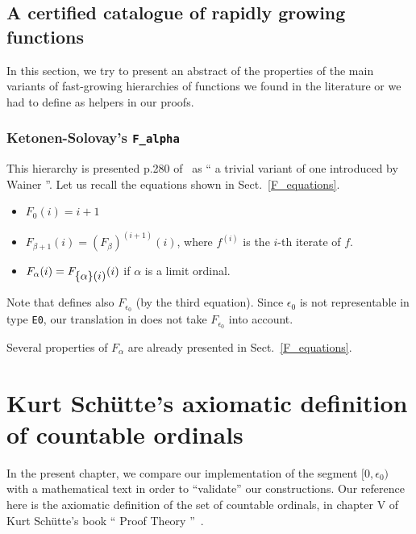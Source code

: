 \section{A certified catalogue of rapidly growing functions}

In this section, we try to present an abstract of the properties of the main variants of fast-growing hierarchies of functions
we found in the literature or we had to define as helpers in our proofs.


\subsection{Ketonen-Solovay's \texttt{F\_alpha}}

  This hierarchy is presented p.280 of~\cite{KS81} as `` a trivial variant of one introduced by Wainer ''.
  Let us recall the equations shown in Sect.~\vref{F_equations}.
  
\begin{itemize}
\item $F_0(i)=i+1$
\item $F_{\beta+1}(i)= (F_\beta)^{(i+1)}(i)$, where $f^{(i)}$ is the $i$-th iterate of $f$.
\item $F_\alpha(i) = F_{\mbox{$\{\alpha\}(i)$}} (i)$ if $\alpha$ is a limit ordinal.
\end{itemize}

Note that \cite{KS81} defines also $F_{\epsilon_0}$ (by the third equation). Since $\epsilon_0$ is not representable in type \texttt{E0}, our translation in \coq{} does not take $F_{\epsilon_0}$ into account.

Several properties of $F_\alpha$ are already presented in Sect.~\ref{F_equations}.





\chapter[Countable ordinals (after Sch\"{u}tte)]{Kurt Schütte's axiomatic definition of countable ordinals}

\label{chap:schutte} 

In the present chapter, we  compare our implementation of the segment $[0,\epsilon_0)$ with a mathematical text in order to ``validate'' our constructions.
Our reference here is the axiomatic definition of the set of countable ordinals,
in chapter V of Kurt Schütte's book `` Proof Theory ''~\cite{schutte}.

